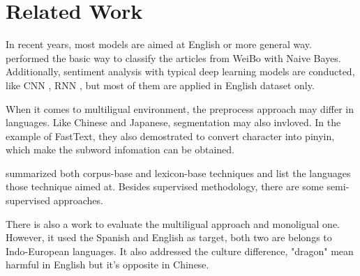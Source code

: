\chapter{Related Work}

In recent years, most models are aimed at English or more general way. 
\cite{zhao2012moodlens} performed the basic way to classify the articles from WeiBo with Naive Bayes.  \\


Additionally, sentiment analysis with typical deep learning models are conducted, like CNN 
\cite{kim2014convolutional}, RNN \cite{arevian2007recurrent}, but most of them are applied in English dataset only. 

When it comes to multiligual environment, the preprocess approach may differ in languages. Like Chinese and Japanese, segmentation may also invloved.
In the example of FastText\cite{joulin2016fasttext}, they also demostrated to convert character into pinyin, which make the subword infomation can be obtained. 

\cite{Dashtipour2016} summarized both corpus-base and lexicon-base techniques and list the languages those technique aimed at. 
Besides supervised methodology, there are some semi-supervised approaches.

There is also a work\cite{multilingual} to evaluate the multiligual approach and monoligual one. However, it used the Spanish and English as target, both two are belongs 
to Indo-European languages. It also addressed the culture difference, "dragon" mean harmful in English but it's opposite in Chinese. 
